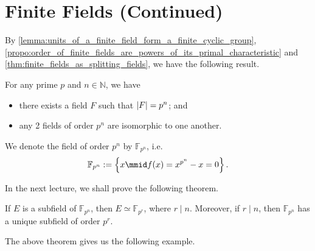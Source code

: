 \documentclass[notoc,notitlepage,nobib]{tufte-book}
\begin{document}
\section{Finite Fields (Continued)}%
\label{sec:finite_fields_continued}

By \cref{lemma:units_of_a_finite_field_form_a_finite_cyclic_group},
\cref{propo:order_of_finite_fields_are_powers_of_its_primal_characteristic} and
\cref{thm:finite_fields_as_splitting_fields}, we have the following result.

\begin{thm}\label{thm:classification_of_finite_fields}
  For any prime $p$ and $n \in \mathbb{N}$, we have
  \begin{itemize}
    \item there exists a field $F$ such that $\left|F\right| = p^n$; and
    \item any 2 fields of order $p^n$ are isomorphic to one another.
  \end{itemize}
\end{thm}

\begin{note}[Notation]
  We denote the field of order $p^n$ by $\mathbb{F}_{p^n}$, i.e.
  \begin{equation*}
    \mathbb{F}_{p^n} := \left\{ x \mmid f(x) = x^{p^n} - x = 0 \right\}.
  \end{equation*}
\end{note}

In the next lecture, we shall prove the following theorem.

\begin{thmnonum}\label{thmnonum:subfields_of_finite_fields}
  If $E$ is a subfield of $\mathbb{F}_{p^n}$, then $E \simeq \mathbb{F}_{p^r}$, where $r
  \mid n$. Moreover, if $r \mid n$, then $\mathbb{F}_{p^n}$ has a unique subfield of order
  $p^r$.
\end{thmnonum}

The above theorem gives us the following example.
\end{document}
